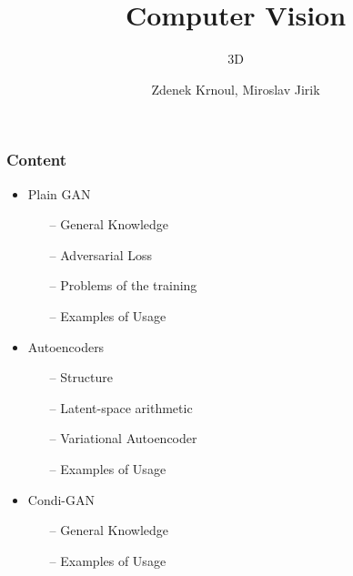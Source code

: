 \title{Computer Vision}
\subtitle{3D}
\author{Zdenek Krnoul, Miroslav Jirik}

\date{} %



\begingroup 
{}

\begin{frame}
	\titlepage
\end{frame}

\addtocounter{framenumber}{-1}
\expandafter\def\expandafter\insertshorttitle\expandafter{%
	\insertshorttitle \hfill \insertframenumber\,/\,\inserttotalframenumber
}


\begin{frame}
	\frametitle{Content}
	\begin{itemize}
		\item Plain GAN
			\begin{itemize}
				\item[--] General Knowledge
				\item[--] Adversarial Loss
				\item[--] Problems of the training
				\item[--] Examples of Usage 
			\end{itemize}
		\item Autoencoders
			\begin{itemize}
				\item[--] Structure
				\item[--] Latent-space arithmetic
				\item[--] Variational Autoencoder
				\item[--] Examples of Usage 
			\end{itemize}
		\item Condi-GAN
			\begin{itemize}
				\item[--] General Knowledge
				\item[--] Examples of Usage 
			\end{itemize}
		
	\end{itemize}
\end{frame}

